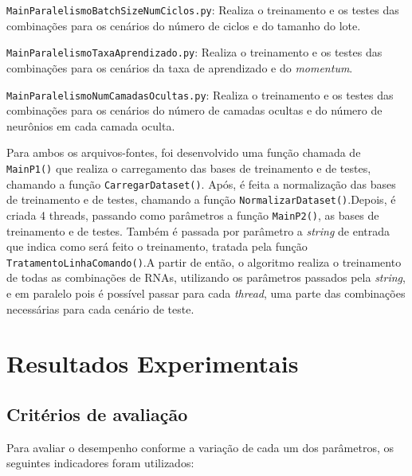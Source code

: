 \documentclass[12pt,oneside,a4paper,chapter=TITLE,section=TITLE,sumario
		=tradicional]{abntex2}
\begin{document}
		\begin{lista}
			\item \texttt{MainParalelismoBatchSizeNumCiclos.py}: Realiza o treinamento e os testes das combinações para os cenários do número de ciclos e do tamanho do lote.
			
			\item \texttt{MainParalelismoTaxaAprendizado.py}: Realiza o treinamento e os testes das combinações para os cenários da taxa de aprendizado e do \textit{momentum}.
			
			\item \texttt{MainParalelismoNumCamadasOcultas.py}: Realiza o treinamento e os testes das combinações para os cenários do número de camadas ocultas e do número de neurônios em cada camada oculta.
		\end{lista}
		
		Para ambos os arquivos-fontes, foi desenvolvido uma função chamada de \texttt{MainP1()} que realiza o carregamento das bases de treinamento e de testes, chamando a função \texttt{CarregarDataset()}. Após, é feita a normalização das bases de treinamento e de testes, chamando a função \texttt{NormalizarDataset()}.\hspace{0.1cm}Depois, é criada 4 threads, passando como parâmetros a função \texttt{MainP2()}, as bases de treinamento e de testes. Também é passada por parâmetro a \textit{string} de entrada que indica como será feito o treinamento, tratada pela função \texttt{TratamentoLinhaComando()}.\hspace{0.1cm}A partir de então, o algoritmo realiza o treinamento de todas as combinações de RNAs, utilizando os parâmetros passados pela \textit{string}, e em paralelo pois é possível passar para cada \textit{thread}, uma parte das combinações necessárias para cada cenário de teste. 
		
		\chapter{Resultados Experimentais}
		\label{cap:resultados}
		
		\section{Critérios de avaliação}
		
		Para avaliar o desempenho conforme a variação de cada um dos parâmetros, os seguintes indicadores foram utilizados: 
		
\end{document}
